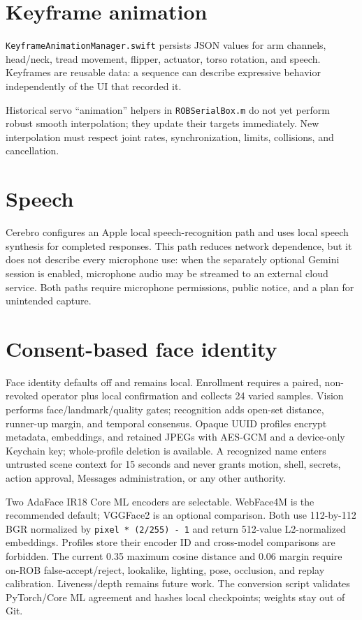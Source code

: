 \documentclass[10pt,openany]{book}
\begin{document}
\section{Keyframe animation}

\Implemented\quad \texttt{KeyframeAnimationManager.swift} persists JSON values for arm channels, head/neck, tread movement, flipper, actuator, torso rotation, and speech. Keyframes are reusable data: a sequence can describe expressive behavior independently of the UI that recorded it.

\Commanded\quad Historical servo ``animation'' helpers in \texttt{ROBSerialBox.m} do not yet perform robust smooth interpolation; they update their targets immediately. New interpolation must respect joint rates, synchronization, limits, collisions, and cancellation.

\section{Speech}

\Implemented\quad Cerebro configures an Apple local speech-recognition path and uses local speech synthesis for completed responses. This path reduces network dependence, but it does not describe every microphone use: when the separately optional Gemini session is enabled, microphone audio may be streamed to an external cloud service. Both paths require microphone permissions, public notice, and a plan for unintended capture.

\section{Consent-based face identity}

\Experimental\quad Face identity defaults off and remains local. Enrollment requires a paired, non-revoked operator plus local confirmation and collects 24 varied samples. Vision performs face/landmark/quality gates; recognition adds open-set distance, runner-up margin, and temporal consensus. Opaque UUID profiles encrypt metadata, embeddings, and retained JPEGs with AES-GCM and a device-only Keychain key; whole-profile deletion is available. A recognized name enters untrusted scene context for 15 seconds and never grants motion, shell, secrets, action approval, Messages administration, or any other authority.

Two AdaFace IR18 Core ML encoders are selectable. WebFace4M is the recommended default; VGGFace2 is an optional comparison. Both use 112-by-112 BGR normalized by \texttt{pixel * (2/255) - 1} and return 512-value L2-normalized embeddings. Profiles store their encoder ID and cross-model comparisons are forbidden. The current 0.35 maximum cosine distance and 0.06 margin require on-ROB false-accept/reject, lookalike, lighting, pose, occlusion, and replay calibration. Liveness/depth remains future work. The conversion script validates PyTorch/Core ML agreement and hashes local checkpoints; weights stay out of Git.
\end{document}
